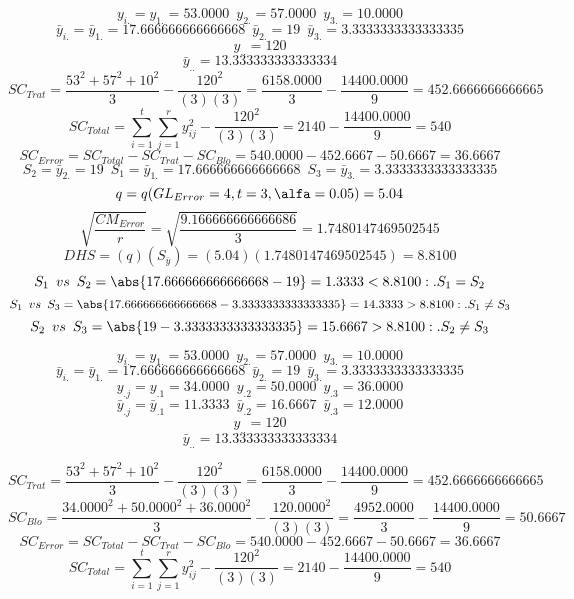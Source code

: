 % 
% 
% 
% 
% 
% 
% 
$$y_{i.}=y_{1.}=53.0000 \enspace y_{2.}=57.0000 \enspace y_{3.}=10.0000$$
$$\bar{y}_{i.}=\bar{y}_{1.}=17.666666666666668 \enspace \bar{y}_{2.}=19 \enspace \bar{y}_{3.}=3.3333333333333335$$
$$y_{..}=120$$
$$\bar{y}_{..}=13.333333333333334$$
$$SC_{Trat}=\frac{53^{2}+57^{2}+10^{2}}{3}-\frac{120^{2}}{(3)(3)}=\frac{6158.0000}{3}-\frac{14400.0000}{9}=452.6666666666665$$
$$SC_{Total}=\sum_{i=1}^{\mathit{t}}\sum_{j=1}^{\mathit{r}}y_{ij}^{2}-\frac{120^{2}}{(3)(3)}=2140-\frac{14400.0000}{9}=540$$
$$SC_{Error}=SC_{Total}-SC_{Trat}-SC_{Blo}=540.0000-452.6667-50.6667=36.6667$$
$$S_{2}=\bar{y}_{2.}=19 \enspace S_{1}=\bar{y}_{1.}=17.666666666666668 \enspace S_{3}=\bar{y}_{3.}=3.3333333333333335$$
$$q=q(GL_{Error}=4, t=3, \alfa=0.05)=5.04$$
$$\sqrt{\frac{CM_{Error}}{r}}=\sqrt{\frac{9.166666666666686}{3}}=1.7480147469502545$$
$$DHS=(q)(S_{\bar{y}})=(5.04)(1.7480147469502545)=8.8100$$
$$S_{1} \enspace vs \enspace S_{2} = \abs{17.666666666666668-19}=1.3333<8.8100:.S_{1}=S_{2}$$
$$S_{1} \enspace vs \enspace S_{3} = \abs{17.666666666666668-3.3333333333333335}=14.3333>8.8100:.S_{1}\not=S_{3}$$
$$S_{2} \enspace vs \enspace S_{3} = \abs{19-3.3333333333333335}=15.6667>8.8100:.S_{2}\not=S_{3}$$


$$y_{i.}=y_{1.}=53.0000 \enspace y_{2.}=57.0000 \enspace y_{3.}=10.0000$$
$$\bar{y}_{i.}=\bar{y}_{1.}=17.666666666666668 \enspace \bar{y}_{2.}=19 \enspace \bar{y}_{3.}=3.3333333333333335$$
$$y_{.j}=y_{.1}=34.0000 \enspace y_{.2}=50.0000 \enspace y_{.3}=36.0000$$
$$\bar{y}_{.j}=\bar{y}_{.1}=11.3333 \enspace \bar{y}_{.2}=16.6667 \enspace \bar{y}_{.3}=12.0000$$
$$y_{..}=120$$
$$\bar{y}_{..}=13.333333333333334$$

$$SC_{Trat}=\frac{53^{2}+57^{2}+10^{2}}{3}-\frac{120^{2}}{(3)(3)}=\frac{6158.0000}{3}-\frac{14400.0000}{9}=452.6666666666665$$
$$SC_{Blo}=\frac{34.0000^{2}+50.0000^{2}+36.0000^{2}}{3}-\frac{120.0000^{2}}{(3)(3)}=\frac{4952.0000}{3}-\frac{14400.0000}{9}=50.6667$$
$$SC_{Error}=SC_{Total}-SC_{Trat}-SC_{Blo}=540.0000-452.6667-50.6667=36.6667$$
$$SC_{Total}=\sum_{i=1}^{\mathit{t}}\sum_{j=1}^{\mathit{r}}y_{ij}^{2}-\frac{120^{2}}{(3)(3)}=2140-\frac{14400.0000}{9}=540$$

